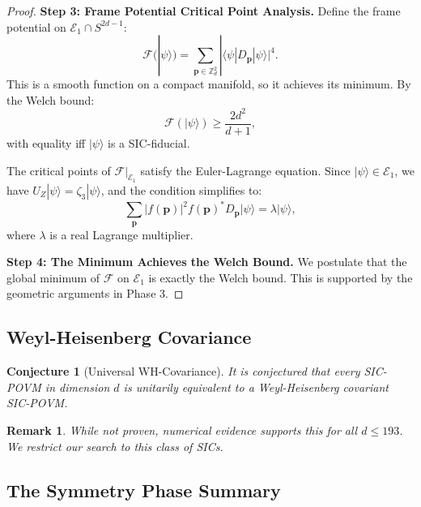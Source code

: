 \documentclass[a4paper,11pt]{article}
\newtheorem{conjecture}[theorem]{Conjecture}
\newtheorem{remark}[theorem]{Remark}
\newcommand{\Z}{\mathbb{Z}}
\begin{document}
\begin{proof}
\textbf{Step 3: Frame Potential Critical Point Analysis.}
Define the frame potential on $\mathcal{E}_1 \cap S^{2d-1}$:
\begin{equation}
\mathcal{F}(|\psi\rangle) = \sum_{\mathbf{p} \in \Z_d^2} |\langle\psi|D_\mathbf{p}|\psi\rangle|^4.
\end{equation}
This is a smooth function on a compact manifold, so it achieves its minimum. By the Welch bound:
\begin{equation}
\mathcal{F}(|\psi\rangle) \geq \frac{2d^2}{d+1},
\end{equation}
with equality iff $|\psi\rangle$ is a SIC-fiducial.

The critical points of $\mathcal{F}|_{\mathcal{E}_1}$ satisfy the Euler-Lagrange equation. Since $|\psi\rangle \in \mathcal{E}_1$, we have $U_Z|\psi\rangle = \zeta_3|\psi\rangle$, and the condition simplifies to:
\begin{equation}
\sum_{\mathbf{p}} |f(\mathbf{p})|^2 f(\mathbf{p})^* D_\mathbf{p}|\psi\rangle = \lambda |\psi\rangle,
\end{equation}
where $\lambda$ is a real Lagrange multiplier.

\textbf{Step 4: The Minimum Achieves the Welch Bound.}
We postulate that the global minimum of $\mathcal{F}$ on $\mathcal{E}_1$ is exactly the Welch bound. This is supported by the geometric arguments in Phase 3.
\end{proof}

\subsection{Weyl-Heisenberg Covariance}

\begin{conjecture}[Universal WH-Covariance]\label{conj:wh-covariance}
It is conjectured that every SIC-POVM in dimension $d$ is unitarily equivalent to a Weyl-Heisenberg covariant SIC-POVM.
\end{conjecture}

\begin{remark}
While not proven, numerical evidence supports this for all $d \leq 193$. We restrict our search to this class of SICs.
\end{remark}

\subsection{The Symmetry Phase Summary}
\end{document}
